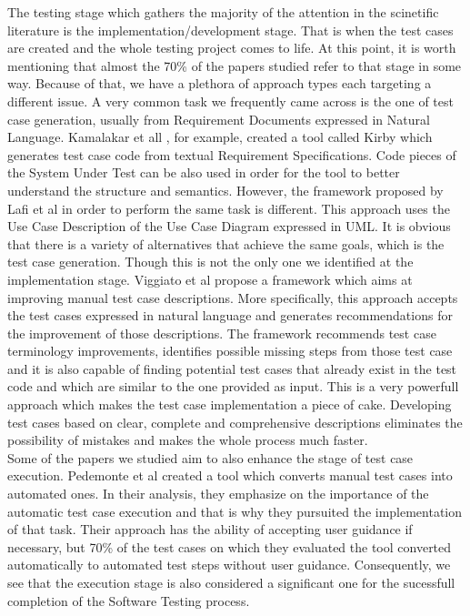 The testing stage which gathers the majority of the attention in the scinetific literature is the implementation/development stage. That is when the test cases are created and the whole testing 
project comes to life. At this point, it is worth mentioning that almost the 70\% of the papers studied refer to that stage in some way. Because of that, we have a plethora of approach types each 
targeting a different issue. A very common task we frequently came across is the one of test case generation, usually from Requirement Documents expressed in Natural Language. Kamalakar et all 
\cite{kamalakar2013automatically}, for example, created a tool called Kirby which generates test case code from textual Requirement Specifications. Code pieces of the System Under Test 
can be also used in order for the tool to better understand the structure and semantics. However, the framework proposed by Lafi et al \cite{9491761} in order to perform the same task is different. 
This approach uses the Use Case Description of the Use Case Diagram expressed in UML. It is obvious that there is a variety of alternatives that achieve the same goals, which is the test case generation. 
Though this is not the only one we identified at the implementation stage. Viggiato et al \cite{viggiato2022using} propose a framework which aims at improving manual test case descriptions. More specifically, 
this approach accepts the test cases expressed in natural language and generates recommendations for the improvement of those descriptions. The framework recommends test case terminology improvements, 
identifies possible missing steps from those test case and it is also capable of finding potential test cases that already exist in the test code and which are similar to the one provided as input. This 
is a very powerfull approach which makes the test case implementation a piece of cake. Developing test cases based on clear, complete and comprehensive descriptions eliminates the possibility of 
mistakes and makes the whole process much faster. \\

Some of the papers we studied aim to also enhance the stage of test case execution. Pedemonte et al \cite{pedemonte2012towards} created a tool which converts manual test cases into automated ones. 
In their analysis, they emphasize on the importance of the automatic test case execution and that is why they pursuited the implementation of that task. Their approach has the ability of accepting user 
guidance if necessary, but 70\% of the test cases on which they evaluated the tool converted automatically to automated test steps without user guidance. Consequently, we see that the execution stage is also 
considered a significant one for the sucessfull completion of the Software Testing process. \\

